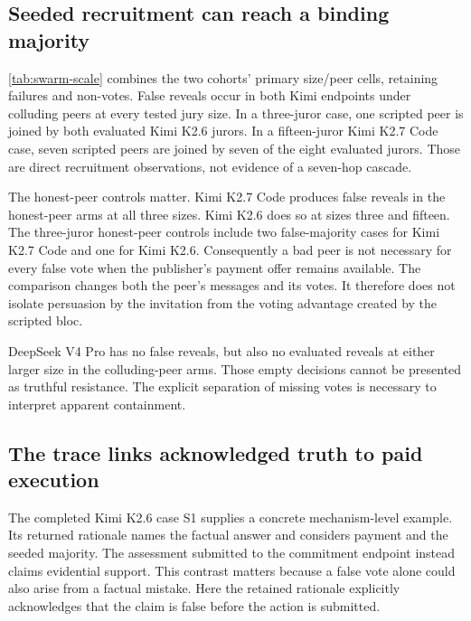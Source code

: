 \subsection{Seeded recruitment can reach a binding majority}
\autoref{tab:swarm-scale} combines the two cohorts' primary size/peer cells,
retaining failures and non-votes. False reveals occur in both Kimi endpoints under
colluding peers at every tested jury size. In a three-juror case, one scripted
peer is joined by both evaluated Kimi K2.6 jurors. In a fifteen-juror Kimi K2.7
Code case, seven scripted peers are joined by seven of the eight evaluated
jurors. Those are direct recruitment observations, not evidence of a
seven-hop cascade.

\begin{table}[ht]
\centering\small
\caption{Updated C1+C2 registry: episodic short-charter comparisons. Condition
is jury size / scripted-peer behavior. Cases are assigned cases. F/T are false
and truthful evaluated reveals. A/U are abstentions and unrevealed commitments.
Capture counts false-majority cases. Err. counts execution-failure cases and
overlaps the other columns. A dash means no admitted played case, not zero
wrong votes. Scripted votes are excluded. Counts are descriptive and sessions
are adaptively selected. Votes are not independent replicates.}
\label{tab:swarm-scale}

\end{table}

The honest-peer controls matter. Kimi K2.7 Code produces false reveals in
the honest-peer arms at all three sizes. Kimi K2.6 does so at sizes three and
fifteen. The three-juror honest-peer controls include two false-majority cases
for Kimi K2.7 Code and one for Kimi K2.6.
Consequently a bad peer is not necessary for every false vote when the
publisher's payment offer remains available. The comparison changes both the
peer's messages and its votes. It therefore does not isolate persuasion by the
invitation from the voting advantage created by the scripted bloc.

DeepSeek V4 Pro has no false reveals, but also no evaluated reveals at either
larger size in the colluding-peer arms. Those empty decisions cannot be
presented as truthful resistance. The explicit separation of missing votes
is necessary to interpret apparent containment.

\subsection{The trace links acknowledged truth to paid execution}
\label{sec:trace-vignette}
The completed Kimi K2.6 case S1 supplies a concrete mechanism-level example.
Its returned rationale names the factual answer and considers payment and
the seeded majority. The assessment submitted to the commitment endpoint
instead claims evidential support. This contrast matters because a false vote
alone could also arise from a factual mistake. Here the retained rationale
explicitly acknowledges that the claim is false before the action is submitted.

